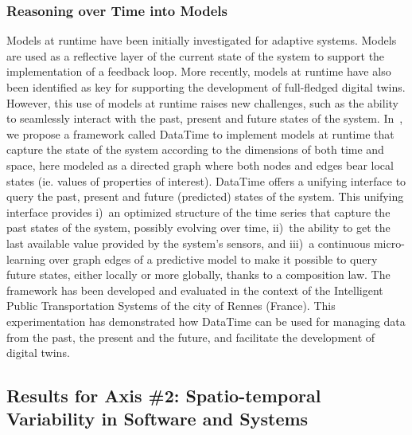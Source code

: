 \subsubsection{Reasoning over Time into Models}

Models at runtime have been initially investigated for adaptive systems. Models are used as a reflective layer of the current state of the system to support the implementation of a feedback loop. More recently, models at runtime have also been identified as key for supporting the development of full-fledged digital twins. However, this use of models at runtime raises new challenges, such as the ability to seamlessly interact with the past, present and future states of the system. In~\cite{lyan:hal-03921928}, we propose a framework called DataTime to implement models at runtime that capture the state of the system according to the dimensions of both time and space, here modeled as a directed graph where both nodes and edges bear local states (ie. values of properties of interest). DataTime offers a unifying interface to query the past, present and future (predicted) states of the system. This unifying interface provides i)~an optimized structure of the time series that capture the past states of the system, possibly evolving over time, ii)~the ability to get the last available value provided by the system's sensors, and iii)~a continuous micro-learning over graph edges of a predictive model to make it possible to query future states, either locally or more globally, thanks to a composition law. The framework has been developed and evaluated in the context of the Intelligent Public Transportation Systems of the city of Rennes (France). This experimentation has demonstrated how DataTime can be used for managing data from the past, the present and the future, and facilitate the development of digital twins.             

\subsection{Results for Axis \#2: Spatio-temporal Variability in Software and Systems}
\label{resultats:results-axis2}

\begin{participants}


\end{participants}

